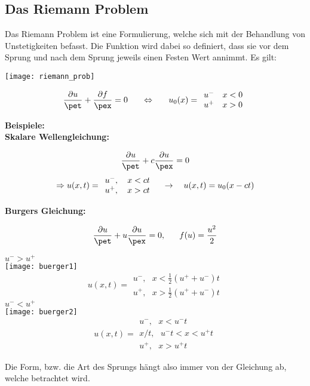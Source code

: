 \subsection{Das Riemann Problem}
Das Riemann Problem ist eine Formulierung, welche sich mit der Behandlung von Unstetigkeiten befasst. Die Funktion wird dabei so definiert, dass sie vor dem Sprung und nach dem Sprung jeweils einen Festen Wert annimmt. Es gilt:
\par
\begin{multicols}{2}
\texttt{[image: riemann\_prob]}
\par
\begin{equation*}
	\frac{\partial u}{\pet} + \frac{\partial f}{\pex} = 0~~~~~\Leftrightarrow~~~~~u_0(x) = \begin{array}{l} u^-~~~x<0 \\ u^+~~~x>0\end{array}
\end{equation*}
\end{multicols}
\textbf{Beispiele:}\\
\textbf{Skalare Wellengleichung:}
\par
\begin{equation*}
	\frac{\partial u}{\pet} + c\frac{\partial u}{\pex} = 0
\end{equation*}
\begin{equation*}
	\Rightarrow u(x,t)=\begin{array}{l l} u^-, ~~~ x<ct \\ u^+, ~~~ x>ct \end{array} ~~~\rightarrow~~~ u(x,t) = u_0(x-ct)
\end{equation*}

\newpage

\textbf{Burgers Gleichung:}
\par
\begin{equation*}
	\frac{\partial u}{\pet} + u\frac{\partial u}{\pex} = 0, ~~~~~ f(u)=\frac{u^2}{2}
\end{equation*}
\tudrule
\begin{multicols}{2}
	$u^->u^+$\\
	\texttt{[image: buerger1]}
	\begin{equation}
		u(x,t) = \begin{array}{l} u^-,~~~x<\frac{1}{2}(u^++u^-)t \\ u^+,~~~x>\frac{1}{2}(u^++u^-)t \end{array}
	\end{equation}
\vfill\null
\columnbreak
	$u^-<u^+$\\
	\texttt{[image: buerger2]}
	\begin{equation*}
		u(x,t) = \begin{array}{l} u^-,~~~x<u^-t \\ x/t, ~~~ u^-t<x<u^+t \\ u^+,~~~x>u^+t \end{array}
	\end{equation*}
\end{multicols}
Die Form, bzw. die Art des Sprungs h\"angt also immer von der Gleichung ab, welche betrachtet wird.

